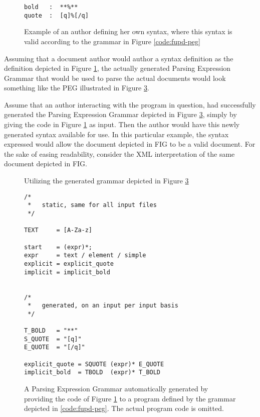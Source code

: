 \documentclass{scrreprt}
\begin{document}
\begin{figure}[h]
\begin{lstlisting}
bold   :  **%**
quote  :  [q]%[/q]
\end{lstlisting}
\caption{Example of an author defining her own syntax, where this syntax is valid according to the grammar in Figure \ref{code:fupd-peg}}
\label{code:fupd-example-usage-syntax}
\end{figure}


Assuming that a document author would author a syntax definition as the definition depicted in Figure \ref{code:fupd-example-usage-syntax}, the actually generated Parsing Expression Grammar that would be used to parse the actual documents would look something like the PEG illustrated in Figure \ref{code:fupd-example-generated-peg}.


Assume that an author interacting with the program in question, had successfully generated the Parsing Expression Grammar depicted in Figure \ref{code:fupd-example-generated-peg}, simply by giving the code in Figure \ref{code:fupd-example-usage-syntax} as input. Then the author would have this newly generated syntax available for use. In this particular example, the syntax expressed would allow the document depicted in FIG to be a valid document. For the sake of easing readability, consider the XML interpretation of the same document depicted in FIG.

\begin{figure}[h]
\centering
{}
\caption{Utilizing the generated grammar depicted in Figure \ref{code:fupd-example-generated-peg}}
\label{code:fup-example-markup}
\end{figure}



\begin{figure}[h]
\begin{lstlisting}
/*
 *   static, same for all input files
 */

TEXT     = [A-Za-z]

start    = (expr)*;
expr     = text / element / simple
explicit = explicit_quote
implicit = implicit_bold


/*
 *   generated, on an input per input basis
 */

T_BOLD   = "**"
S_QUOTE  = "[q]"
E_QUOTE  = "[/q]"

explicit_quote = SQUOTE (expr)* E_QUOTE
implicit_bold  = TBOLD  (expr)* T_BOLD
\end{lstlisting}
\caption{A Parsing Expression Grammar automatically generated by providing the code of Figure \ref{code:fupd-example-usage-syntax} to a program defined by the grammar depicted in \ref{code:fupd-peg}. The actual program code is omitted.}
\label{code:fupd-example-generated-peg}
\end{figure}
\end{document}
